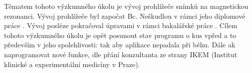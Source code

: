 \vspace{-10mm}
Tématem tohoto výzkumného úkolu je vývoj prohlížeče snímků na magnetickou rezonanci. Vývoj prohlížeče byl započat Bc. Neškudlou v rámci jeho diplomové práce \cite{neskudla}. Vývoj posléze pokračoval úpravami v rámci bakalářské práce 
\cite{flaska}. Cílem tohoto výzkumného úkolu je opět posunout stav programu o kus vpřed a to především v jeho spolehlivosti: tak aby aplikace nepadala při běhu. Dále ak naprogramovat nové funkce, dle přání konzultanta ze strany IKEM (Institut klinické a experimentální medicíny v Praze).
